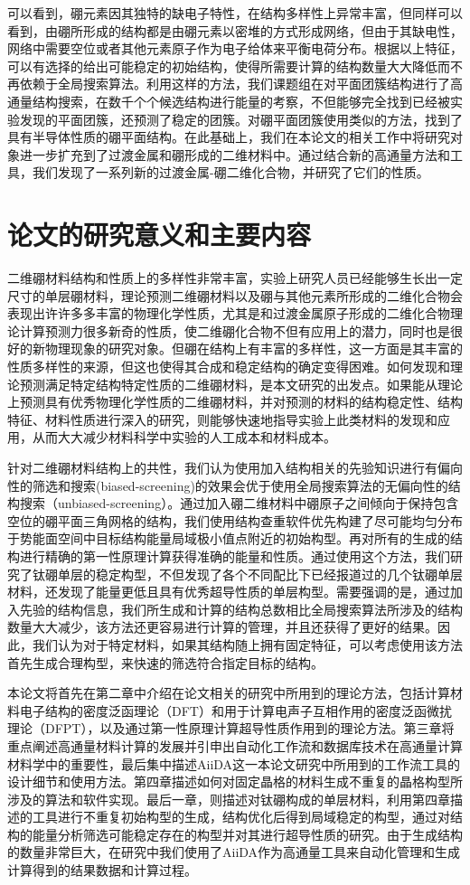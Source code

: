 可以看到，硼元素因其独特的缺电子特性，在结构多样性上异常丰富，但同样可以看到，由硼所形成的结构都是由硼元素以密堆的方式形成网络，但由于其缺电性，网络中需要空位或者其他元素原子作为电子给体来平衡电荷分布。根据以上特征，可以有选择的给出可能稳定的初始结构，使得所需要计算的结构数量大大降低而不再依赖于全局搜索算法。利用这样的方法，我们课题组在对平面团簇结构进行了高通量结构搜索，在数千个个候选结构进行能量的考察，不但能够完全找到已经被实验发现的平面团簇，还预测了稳定的团簇\cite{xu2017practical}。对硼平面团簇使用类似的方法，找到了具有半导体性质的硼平面结构\cite{xu2017two}。在此基础上，我们在本论文的相关工作中将研究对象进一步扩充到了过渡金属和硼形成的二维材料中。通过结合新的高通量方法和工具，我们发现了一系列新的过渡金属-硼二维化合物，并研究了它们的性质。

\section{论文的研究意义和主要内容}
二维硼材料结构和性质上的多样性非常丰富，实验上研究人员已经能够生长出一定尺寸的单层硼材料，理论预测二维硼材料以及硼与其他元素所形成的二维化合物会表现出许许多多丰富的物理化学性质，尤其是和过渡金属原子形成的二维化合物理论计算预测力很多新奇的性质，使二维硼化合物不但有应用上的潜力，同时也是很好的新物理现象的研究对象。但硼在结构上有丰富的多样性，这一方面是其丰富的性质多样性的来源，但这也使得其合成和稳定结构的确定变得困难。如何发现和理论预测满足特定结构特定性质的二维硼材料，是本文研究的出发点。如果能从理论上预测具有优秀物理化学性质的二维硼材料，并对预测的材料的结构稳定性、结构特征、材料性质进行深入的研究，则能够快速地指导实验上此类材料的发现和应用，从而大大减少材料科学中实验的人工成本和材料成本。

针对二维硼材料结构上的共性，我们认为使用加入结构相关的先验知识进行有偏向性的筛选和搜索(biased-screening)的效果会优于使用全局搜索算法的无偏向性的结构搜索（unbiased-screening）。通过加入硼二维材料中硼原子之间倾向于保持包含空位的硼平面三角网格的结构，我们使用结构查重软件优先构建了尽可能均匀分布于势能面空间中目标结构能量局域极小值点附近的初始构型。再对所有的生成的结构进行精确的第一性原理计算获得准确的能量和性质。通过使用这个方法，我们研究了钛硼单层的稳定构型，不但发现了各个不同配比下已经报道过的几个钛硼单层材料，还发现了能量更低且具有优秀超导性质的单层构型。需要强调的是，通过加入先验的结构信息，我们所生成和计算的结构总数相比全局搜索算法所涉及的结构数量大大减少，该方法还更容易进行计算的管理，并且还获得了更好的结果。因此，我们认为对于特定材料，如果其结构随上拥有固定特征，可以考虑使用该方法首先生成合理构型，来快速的筛选符合指定目标的结构。

本论文将首先在第二章中介绍在论文相关的研究中所用到的理论方法，包括计算材料电子结构的密度泛函理论（DFT）和用于计算电声子互相作用的密度泛函微扰理论（DFPT），以及通过第一性原理计算超导性质作用到的理论方法。第三章将重点阐述高通量材料计算的发展并引申出自动化工作流和数据库技术在高通量计算材料学中的重要性，最后集中描述AiiDA这一本论文研究中所用到的工作流工具的设计细节和使用方法。第四章描述如何对固定晶格的材料生成不重复的晶格构型所涉及的算法和软件实现。最后一章，则描述对钛硼构成的单层材料，利用第四章描述的工具进行不重复初始构型的生成，结构优化后得到局域稳定的构型，通过对结构的能量分析筛选可能稳定存在的构型并对其进行超导性质的研究。由于生成结构的数量非常巨大，在研究中我们使用了AiiDA作为高通量工具来自动化管理和生成计算得到的结果数据和计算过程。
